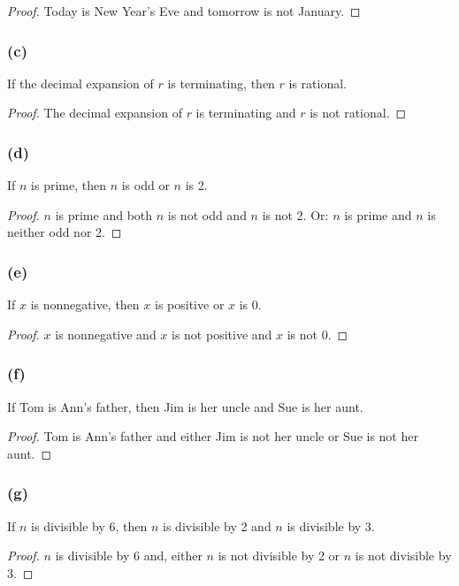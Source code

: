 \documentclass[14pt]{extarticle}
\begin{document}
\begin{proof}
    Today is New Year’s Eve and tomorrow is not January.
\end{proof}

\subsubsection{(c)}
If the decimal expansion of $r$ is terminating, then $r$ is rational.

\begin{proof}
    The decimal expansion of $r$ is terminating and $r$ is not rational.
\end{proof}

\subsubsection{(d)}
If $n$ is prime, then $n$ is odd or $n$ is 2.

\begin{proof}
    $n$ is prime and both $n$ is not odd and $n$ is not 2. Or: $n$ is prime and $n$ is neither odd nor 2.
\end{proof}

\subsubsection{(e)}
If $x$ is nonnegative, then $x$ is positive or $x$ is 0.

\begin{proof}
    $x$ is nonnegative and $x$ is not positive and $x$ is not 0.
\end{proof}

\subsubsection{(f)}
If Tom is Ann’s father, then Jim is her uncle and Sue is her aunt.

\begin{proof}
    Tom is Ann’s father and either Jim is not her uncle or Sue is not her aunt.
\end{proof}

\subsubsection{(g)}
If $n$ is divisible by 6, then $n$ is divisible by 2 and $n$
is divisible by 3.

\begin{proof}
    $n$ is divisible by 6 and, either $n$ is not divisible by 2 or $n$ is not divisible by 3.
\end{proof}
\end{document}
